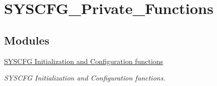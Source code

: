 \hypertarget{group___s_y_s_c_f_g___private___functions}{\section{S\-Y\-S\-C\-F\-G\-\_\-\-Private\-\_\-\-Functions}
\label{group___s_y_s_c_f_g___private___functions}
}
\subsection*{Modules}
\begin{DoxyCompactItemize}
\item 
\hyperlink{group___s_y_s_c_f_g___group1}{S\-Y\-S\-C\-F\-G Initialization and Configuration functions}
\begin{DoxyCompactList}\small\item\em S\-Y\-S\-C\-F\-G Initialization and Configuration functions. \end{DoxyCompactList}\end{DoxyCompactItemize}
